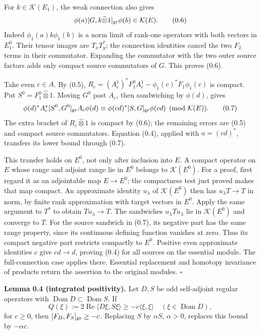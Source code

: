 \documentclass[
  11pt,
]{article}
\begin{document}
For \(k\in\mathcal K(E_1)\), the weak connection also gives \[
\phi(a)[G,k\widehat\otimes1]_{\rm gr}\phi(b)\in\mathcal K(E).
\tag{0.6}
\] Indeed \(\phi_1(a)k\phi_1(b)\) is a norm limit of rank-one operators
with both vectors in \(E_1^0\). Their tensor images are \(T_xT_y^*\);
the connection identities cancel the two \(F_2\) terms in their
commutator. Expanding the commutator with the two outer source factors
adds only compact source commutators of \(G\). This proves (0.6).

Take even \(c\in A\). By (0.5),
\(R_c=(A_c^1)^*F_1^0A_c^1-\phi_1(c)^*F_1\phi_1(c)\) is compact. Put
\(S^0=F_1^0\widehat\otimes1\). Moving \(G^0\) past \(A_c\), then
sandwiching by \(\phi(d)\), gives \[
\phi(d)^*A_c^*[S^0,G^0]_{\rm gr}A_c\phi(d)
\equiv\phi(cd)^*[S,G]_{\rm gr}\phi(cd)
\pmod{\mathcal K(E)}.
\tag{0.7}
\] The extra bracket of \(R_c\widehat\otimes1\) is compact by (0.6); the
remaining errors are (0.5) and compact source commutators. Equation
(0.4), applied with \(a=(cd)^*\), transfers its lower bound through
(0.7).

This transfer holds on \(E^0\), not only after inclusion into \(E\). A
compact operator on \(E\) whose range and adjoint range lie in \(E^0\)
belongs to \(\mathcal K(E^0)\). For a proof, first regard it as an
adjointable map \(E\to E^0\); the compactness test just proved makes
that map compact. An approximate identity \(u_\lambda\) of
\(\mathcal K(E^0)\) then has \(u_\lambda T\to T\) in norm, by finite
rank approximation with target vectors in \(E^0\). Apply the same
argument to \(T^*\) to obtain \(Tu_\lambda\to T\). The sandwiches
\(u_\lambda T u_\lambda\) lie in \(\mathcal K(E^0)\) and converge to
\(T\). For the source sandwich in (0.7), its negative part has the same
range property, since its continuous defining function vanishes at zero.
Thus its compact negative part restricts compactly to \(E^0\). Positive
even approximate identities \(c\) give \(cd\to d\), proving (0.4) for
all sources on the essential module. The full-connection case applies
there. Essential replacement and homotopy invariance of products return
the assertion to the original modules. \(\square\)

\textbf{Lemma 0.4 (integrated positivity).} Let \(D,S\) be odd
self-adjoint regular operators with
\(\operatorname{Dom}D\subset\operatorname{Dom}S\). If \[
Q(\xi):=2\operatorname{Re}\langle D\xi,S\xi\rangle
\geq-c\langle\xi,\xi\rangle\quad(\xi\in\operatorname{Dom}D),
\tag{0.8}
\] for \(c\geq0\), then \([F_D,F_S]_{\rm gr}\geq-c\). Replacing \(S\) by
\(\alpha S\), \(\alpha>0\), replaces this bound by \(-\alpha c\).
\end{document}
